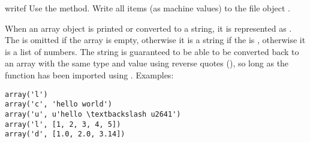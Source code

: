 \begin{methoddesc}[array]{write}{f}
  {Use the  method.}
Write all items (as machine values) to the file object .
\end{methoddesc}

When an array object is printed or converted to a string, it is
represented as .  The
 is omitted if the array is empty, otherwise it is a
string if the  is , otherwise it is a list of
numbers.  The string is guaranteed to be able to be converted back to
an array with the same type and value using reverse quotes
(), so long as the  function has been
imported using .  Examples:

\begin{verbatim}
array('l')
array('c', 'hello world')
array('u', u'hello \textbackslash u2641')
array('l', [1, 2, 3, 4, 5])
array('d', [1.0, 2.0, 3.14])
\end{verbatim}


\begin{seealso}
\end{seealso}
